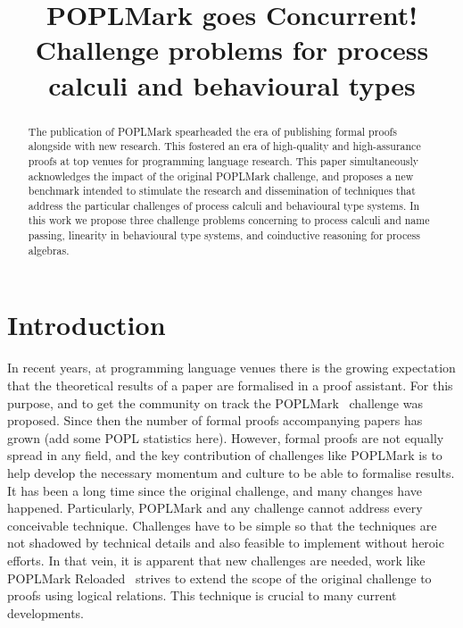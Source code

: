 \documentclass{article}
\begin{document}
\title{POPLMark goes Concurrent!\\Challenge problems for process calculi and behavioural types}

\maketitle

\begin{abstract}
  The publication of POPLMark spearheaded the era of publishing formal
  proofs alongside with new research. This fostered an era of
  high-quality and high-assurance proofs at top venues for programming
  language research. This paper simultaneously acknowledges the impact
  of the original POPLMark challenge, and proposes a new benchmark
  intended to stimulate the research and dissemination of techniques
  that address the particular challenges of process calculi and
  behavioural type systems. In this work we propose three challenge
  problems concerning to process calculi and name passing, linearity
  in behavioural type systems, and coinductive reasoning for process
  algebras.
\end{abstract}

\section{Introduction}

In recent years, at programming language venues there is the growing
expectation that the theoretical results of a paper are formalised in
a proof assistant. %
For this purpose, and to get the community on track the
POPLMark~\cite{Pierce:2005} challenge was proposed. Since then the
number of formal proofs accompanying papers has grown (add some POPL
statistics here). However, formal proofs are not equally spread in any
field, and the key contribution of challenges like POPLMark is to help
develop the necessary momentum and culture to be able to formalise
results. It has been a long time since the original challenge, and
many changes have happened. Particularly, POPLMark and any challenge
cannot address every conceivable technique. Challenges have to be
simple so that the techniques are not shadowed by technical details
and also feasible to implement without heroic efforts. In that vein,
it is apparent that new challenges are needed, work like POPLMark
Reloaded~\cite{Pientka:2019} strives to extend the scope of the
original challenge to proofs using logical relations. This technique
is crucial to many current developments.
\end{document}

